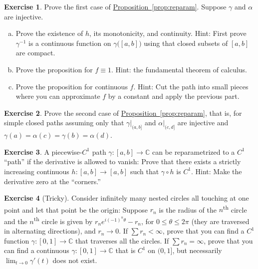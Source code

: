 \documentclass[12pt,openany]{book}
\newcommand{\C}{{\mathbb{C}}}
\newcommand{\myquote}[1]{``#1''}
\theoremstyle{plain}
\theoremstyle{remark}
\theoremstyle{definition}
\newenvironment{exbox}{%
    \def\FrameCommand{\vrule width 1pt \relax\hspace{10pt}}%
    \MakeFramed{\advance\hsize-\width\FrameRestore}%
}{%
    \endMakeFramed
}
\newenvironment{exparts}{%
    \leavevmode\begin{enumerate}[a),noitemsep,topsep=0pt,parsep=0pt,partopsep=0pt]
}{%
    \end{enumerate}
}
\theoremstyle{exercise}
\newtheorem{exercise}{Exercise}[section]
\theoremstyle{example}
\newcommand{\propref}[1]{\hyperref[#1]{Proposition~\ref*{#1}}}
\begin{document}
\begin{exbox}
\begin{exercise}
Prove the first case of \propref{prop:reparam}.
Suppose $\gamma$ and $\alpha$ are injective.
\begin{exparts}
\item
Prove the existence of $h$, its monotonicity, and continuity.
Hint: First prove $\gamma^{-1}$ is a continuous function on
$\gamma\bigl([a,b]\bigr)$ using that closed subsets of $[a,b]$
are compact.
\item
Prove the proposition for $f\equiv 1$.
Hint: the fundamental theorem of calculus.
\item
Prove the proposition for continuous $f$.
Hint: Cut the path into small pieces where
you can approximate $f$ by a constant and apply the
previous part.
\end{exparts}
\end{exercise}

\begin{exercise}
Prove the second case of \propref{prop:reparam}, that is,
for simple closed paths assuming only that $\gamma|_{(a,b]}$ and
$\alpha|_{(c,d]}$ are injective and
$\gamma(a)=\alpha(c)=\gamma(b)=\alpha(d)$.
\end{exercise}

\begin{exercise}
A piecewise-$C^1$ path $\gamma \colon [a,b] \to \C$
can be reparametrized to a $C^1$ \myquote{path} if the derivative
is allowed to vanish:
Prove that
there exists a strictly increasing
continuous $h \colon [a,b] \to [a,b]$ such that
$\gamma \circ h$ is $C^1$.
Hint: Make the derivative zero at the \myquote{corners.}
\end{exercise}

\begin{exercise}[Tricky]
Consider infinitely many nested circles all touching at one point
and let that point be the origin: Suppose $r_n$ is the radius of the
$n$\textsuperscript{th}
circle and the $n$\textsuperscript{th} circle is given by $r_n e^{i(-1)^n\theta} - r_n$, for $0 \leq
\theta \leq 2\pi$ (they are traversed in alternating directions),
and $r_n \to 0$.
If $\sum r_n < \infty$, prove that you can find a
$C^1$ function $\gamma \colon
[0,1] \to \C$ that traverses all the circles.  If $\sum r_n = \infty$,
prove that
you can find a continuous $\gamma \colon [0,1] \to \C$ that is $C^1$ on
$(0,1]$, but necessarily $\lim_{t \to 0} \gamma'(t)$ does not exist.
\end{exercise}
\end{exbox}
\end{document}
